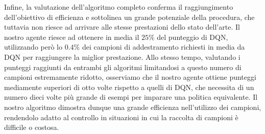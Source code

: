 Infine, la valutazione dell'algoritmo completo conferma il raggiungimento 
dell'obiettivo di efficienza e sottolinea un grande potenziale della procedura,
che tuttavia non riesce ad arrivare alle stesse prestazioni dello stato 
dell'arte.
Il nostro agente riesce ad ottenere in media il $25\%$ del punteggio di DQN, 
utilizzando per\`o lo $0.4\%$ dei campioni di addestramento richiesti in media
da DQN per raggiungere la miglior prestazione. 
Allo stesso tempo, valutando i punteggi raggiunti da entrambi gli algoritmi 
limitandosi a questo numero di campioni estremamente ridotto, osserviamo che
il nostro agente ottiene punteggi mediamente superiori di otto volte rispetto a 
quelli di DQN, che necessita di un numero dieci volte pi\`u grande di esempi 
per imparare una politica equivalente.
Il nostro algoritmo dimostra dunque una grande efficienza nell'utilizzo dei 
campioni, rendendolo adatto al controllo in situazioni in cui la raccolta
di campioni \`e difficile o costosa. 


































